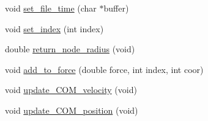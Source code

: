 \begin{DoxyCompactItemize}
void \mbox{\hyperlink{classChromatin_a3187fb5d0aacdf6109af3bbb85a66aa9}{set\+\_\+file\+\_\+time}} (char $\ast$buffer)
\item 
void \mbox{\hyperlink{classChromatin_a58851cf29ad04948463857c99103ccd2}{set\+\_\+index}} (int index)
\item 
double \mbox{\hyperlink{classChromatin_a6b3dc72635d71b50654ba6106d6c3b25}{return\+\_\+node\+\_\+radius}} (void)
\item 
void \mbox{\hyperlink{classChromatin_a5bc9c714d620b6cd1f3b3a6d85dbd1d8}{add\+\_\+to\+\_\+force}} (double force, int index, int coor)
\item 
void \mbox{\hyperlink{classChromatin_ab732de686eb3f5db5ce402b58a5d8ea6}{update\+\_\+\+C\+O\+M\+\_\+velocity}} (void)
\item 
void \mbox{\hyperlink{classChromatin_a95a89f98d688ff8ca440fbef34086199}{update\+\_\+\+C\+O\+M\+\_\+position}} (void)
\end{DoxyCompactItemize}
